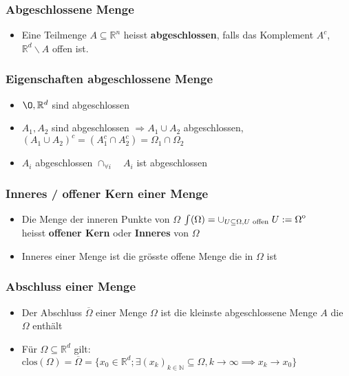 \documentclass[a3paper, 11pt, landscape]{scrartcl}
\newcommand{\Rd}{\mathbb{R}^d}
\newcommand{\xZeroRd}{x_0\in\mathbb{R}^d}
\newcommand{\interior}[1]{%
  {\kern0pt#1}^{\mathrm{o}}%
}
\begin{document}
\begin{multicols*}{3}
	\subsubsection{Abgeschlossene Menge}
	\begin{itemize}
	    \item Eine Teilmenge $A\subseteq \mathbb{R}^n$ heisst \textbf{abgeschlossen}, falls das Komplement $A^c$, $\Rd \backslash A$ offen ist.
	\end{itemize}
	\subsubsection{Eigenschaften abgeschlossene Menge}
	\begin{itemize}
	    \item $\O, \Rd $ sind abgeschlossen
	    \item $A_1,A_2$ sind abgeschlossen $\Rightarrow A_1 \cup A_2$ abgeschlossen, $(A_1\cup A_2)^c=(A_1^c\cap A_2^c)=\Omega_1 \cap \Omega_2$
	    \item $A_i$ abgeschlossen $\cap_{\forall i} \quad A_i$ ist abgeschlossen
	\end{itemize}
	
	\subsubsection{Inneres / offener Kern einer Menge}
	\begin{itemize}
	    \item Die Menge der inneren Punkte von $\Omega$ $\int(\Omega)=\cup_{U\subseteq \Omega, U \text{ offen }}U:=\interior{\Omega}$\\
	    heisst \textbf{offener Kern} oder \textbf{Inneres} von $\Omega$
	    \item Inneres einer Menge ist die grösste offene Menge die in $\Omega$ ist
	\end{itemize}
	
	\subsubsection{Abschluss einer Menge}
	\begin{itemize}
	    \item Der Abschluss $\overline{\Omega}$ einer Menge $\Omega$ ist die kleinste abgeschlossene Menge $A$ die $\Omega$ enthält
	    \item Für $\Omega \subseteq \Rd$ gilt: $\text{clos}(\Omega)=\overline{\Omega}=\{\xZeroRd;\exists(x_k)_{k\in\mathbb{N}}\subseteq\Omega, k\to\infty \implies x_k \to x_0\}$ 
	\end{itemize}
	

\end{multicols*}
\end{document}
